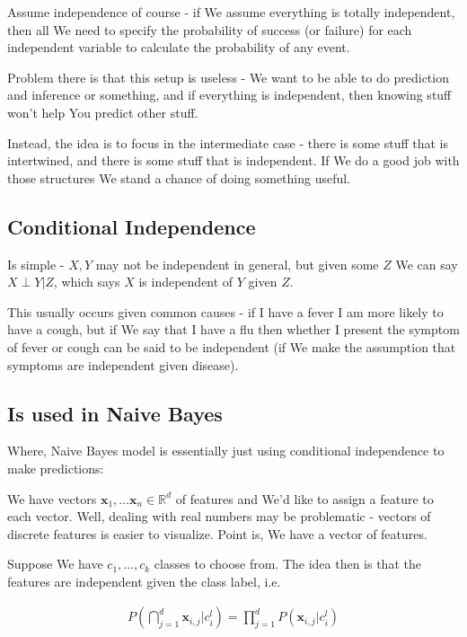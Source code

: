 \documentclass{article}
\begin{document}
		Assume independence of course - if We assume everything is totally independent, then all We need to specify the probability of success (or failure) for each independent variable to calculate the probability of any event.
		
		Problem there is that this setup is useless - We want to be able to do prediction and inference or something, and if everything is independent, then knowing stuff won't help You predict other stuff. 
		
		Instead, the idea is to focus in the intermediate case - there is some stuff that is intertwined, and there is some stuff that is independent. If We do a good job with those structures We stand a chance of doing something useful.
		
	\subsection{Conditional Independence}
	
		Is simple - $X, Y$ may not be independent in general, but given some $Z$ We can say $X\perp Y| Z$, which says $X$ is independent of $Y$ given $Z$.
		
		This usually occurs given common causes - if I have a fever I am more likely to have a cough, but if We say that I have a flu then whether I present the symptom of fever or cough can be said to be independent (if We make the assumption that symptoms are independent given disease).
		
	\subsection{Is used in Naive Bayes}
	
		Where, Naive Bayes model is essentially just using conditional independence to make predictions:
		
		We have vectors $\mathbf{x}_1,\ldots \mathbf{x}_n\in\mathbb{R}^d$ of features and We'd like to assign a feature to each vector. Well, dealing with real numbers may be problematic - vectors of discrete features is easier to visualize. Point is, We have a vector of features.
		
		Suppose We have $c_1,\ldots,c_k$ classes to choose from. The idea then is that the features are independent given the class label, i.e. 
		
		\begin{align}
			P\left( \bigcap^d_{j=1} \mathbf{x}_{i, j} | c^l_i \right) = \prod^d_{j=1} P(\mathbf{x}_{i, j} | c^l_i)
		\end{align}
		
\end{document}
